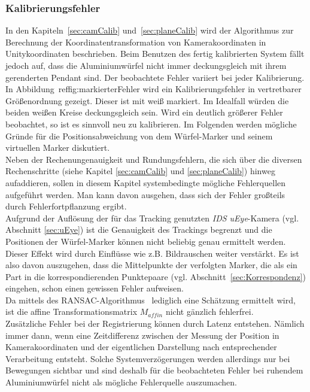 \subsubsection{Kalibrierungsfehler} \label{sec:calibError}
In den Kapiteln~\ref{sec:camCalib} und~\ref{sec:planeCalib} wird der Algorithmus zur Berechnung der Koordinatentransformation von Kamerakoordinaten in Unitykoordinaten beschrieben. Beim Benutzen des fertig kalibrierten System fällt jedoch auf, dass die Aluminiumwürfel nicht immer deckungsgleich mit ihrem gerenderten Pendant sind. Der beobachtete Fehler variiert bei jeder Kalibrierung. In Abbildung~ref{fig:markierterFehler} wird ein Kalibrierungsfehler in vertretbarer Größenordnung gezeigt. Dieser ist mit weiß markiert. Im Idealfall würden die beiden weißen Kreise deckungsgleich sein. Wird ein deutlich größerer Fehler beobachtet, so ist es sinnvoll neu zu kalibrieren. Im Folgenden werden mögliche Gründe für die Positionsabweichung von dem Würfel-Marker und seinem virtuellen Marker diskutiert. \\
Neben der Rechenungenauigkeit und Rundungsfehlern, die sich über die diversen Rechenschritte (siehe Kapitel \ref{sec:camCalib} und \ref{sec:planeCalib}) hinweg aufaddieren, sollen in diesem Kapitel systembedingte mögliche Fehlerquellen aufgeführt werden. Man kann davon ausgehen, dass sich der Fehler großteils durch Fehlerfortpflanzung \cite{schmalstieg2016augmented} ergibt.\\ 
Aufgrund der Auflösung der für das Tracking genutzten \textit{IDS uEye}-Kamera (vgl. Abschnitt \ref{sec:uEye}) ist die Genauigkeit des Trackings begrenzt und die Positionen der Würfel-Marker können nicht beliebig genau ermittelt werden. Dieser Effekt wird durch Einflüsse wie z.B. Bildrauschen weiter verstärkt. Es ist also davon auszugehen, dass die Mittelpunkte der verfolgten Marker, die als ein Part in die korrespondierenden Punktepaare (vgl. Abschnitt~\ref{sec:Korrespondenz}) eingehen, schon einen gewissen Fehler aufweisen. \\
Da mittels des RANSAC-Algorithmus~\cite{articel:RANSAC} lediglich eine Schätzung ermittelt wird, ist die affine Transformationsmatrix $M_{affin}$ nicht gänzlich fehlerfrei. \\
Zusätzliche Fehler bei der Registrierung können durch Latenz entstehen. Nämlich immer dann, wenn eine Zeitdifferenz zwischen der Messung der Position in Kamerakoordinaten und der eigentlichen Darstellung nach entsprechender
Verarbeitung entsteht. Solche Systemverzögerungen werden allerdings nur bei Bewegungen sichtbar und sind deshalb für die beobachteten Fehler bei ruhendem Aluminiumwürfel nicht als mögliche Fehlerquelle auszumachen. 

